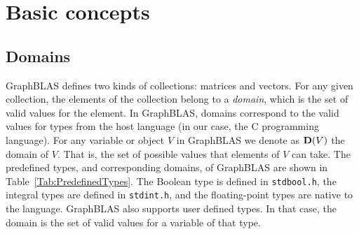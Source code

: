 \documentclass[11pt]{extarticle}
\begin{document}
\section{Basic concepts}

\subsection{Domains}

GraphBLAS defines two kinds of collections: matrices and vectors.
For any given collection, the elements of the collection belong to
a \emph{domain}, which is the set of valid values for the element.
In GraphBLAS, domains correspond to the valid values for types from
the host language (in our case, the C programming language).  For any
variable or object $V$ in GraphBLAS we denote as $\bold{D}(V)$ the
domain of $V$. That is, the set of possible values that elements of
$V$ can take.  The predefined types, and corresponding domains, of
GraphBLAS are shown in Table~\ref{Tab:PredefinedTypes}.  The Boolean
type is defined in {\tt stdbool.h}, the integral types are defined in
{\tt stdint.h}, and the floating-point types are native to the language.
GraphBLAS also supports user defined types. In that case, the domain is
the set of valid values for a variable of that type.
\end{document}

